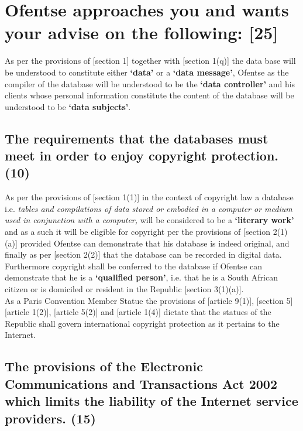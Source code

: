 \documentclass[11pt]{article}
\begin{document}
\section{Ofentse approaches you and wants your advise on the following: [25]}
\label{sec:orgdea6a81}

As per the provisions of [section 1]\cite{rsa02_elect_comm_trans_act} together
with [section 1(q)]\cite{rsa12_elect_comm_trans_amend_bill} the data base will be
understood to constitute either \textbf{`data'} or a \textbf{`data message'}, Ofentse as
the compiler of the database will be understood to be the \textbf{`data controller'}
and his clients whose personal information constitute the content of the
database will be understood to be \textbf{`data subjects'}.

\subsection{The requirements that the databases must meet in order to enjoy copyright protection. (10)}
\label{sec:orgb7d230c}

As per the provisions of [section 1(1)]\cite{rsa78_copyrightact} in the context of
copyright law a database i.e. \emph{tables and compilations of data stored or
embodied in a computer or medium used in conjunction with a computer,} will be
considered to be a \textbf{`literary work'} and as a such it will be eligible for
copyright per the provisions of [section 2(1)(a)]\cite{rsa78_copyrightact}
provided Ofentse can demonstrate that his database is indeed original, and
finally as per [section 2(2)]\cite{rsa78_copyrightact} that the database can be
recorded in digital data. Furthermore copyright shall be conferred to the
database if Ofentse can demonstrate that he is a \textbf{`qualified person'}, i.e. that
he is a South African citizen or is domiciled or resident in the Republic
[section 3(1)(a)]\cite{rsa78_copyrightact}. \\

As a Paris Convention Member Statue the provisions of [article
9(1)]\cite{wto17_trips}, [section 5]\cite{rsa78_copyrightact} [article
1(2)]\cite{eurlex00_elec_commerce}, [article 5(2)]\cite{wipo86_berne} and [article
1(4)]\cite{wipo96_copyright_treaty} dictate that the statues of the Republic shall
govern international copyright protection as it pertains to the Internet.

\subsection{The provisions of the Electronic Communications and Transactions Act 2002 which limits the liability of the Internet service providers. (15)}
\label{sec:org140a1a1}
\end{document}
